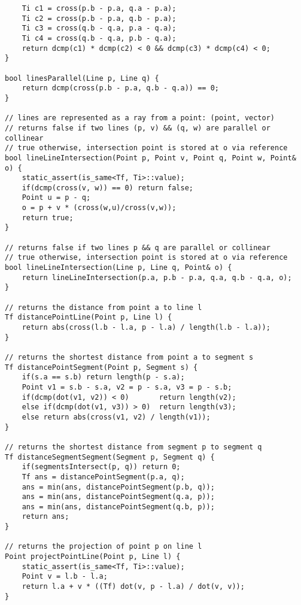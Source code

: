 \documentclass[FSZ,a4paper,onesided]{article}
\begin{document}
\begin{multicols*}{\COLS}
\begin{lstlisting}
    Ti c1 = cross(p.b - p.a, q.a - p.a);
    Ti c2 = cross(p.b - p.a, q.b - p.a);
    Ti c3 = cross(q.b - q.a, p.a - q.a);
    Ti c4 = cross(q.b - q.a, p.b - q.a);
    return dcmp(c1) * dcmp(c2) < 0 && dcmp(c3) * dcmp(c4) < 0;
}

bool linesParallel(Line p, Line q) {
    return dcmp(cross(p.b - p.a, q.b - q.a)) == 0;
}

// lines are represented as a ray from a point: (point, vector)
// returns false if two lines (p, v) && (q, w) are parallel or collinear
// true otherwise, intersection point is stored at o via reference
bool lineLineIntersection(Point p, Point v, Point q, Point w, Point& o) {
    static_assert(is_same<Tf, Ti>::value);
    if(dcmp(cross(v, w)) == 0) return false;
    Point u = p - q;
    o = p + v * (cross(w,u)/cross(v,w));
    return true;
}

// returns false if two lines p && q are parallel or collinear
// true otherwise, intersection point is stored at o via reference
bool lineLineIntersection(Line p, Line q, Point& o) {
    return lineLineIntersection(p.a, p.b - p.a, q.a, q.b - q.a, o);
}

// returns the distance from point a to line l
Tf distancePointLine(Point p, Line l) {
    return abs(cross(l.b - l.a, p - l.a) / length(l.b - l.a));
}

// returns the shortest distance from point a to segment s
Tf distancePointSegment(Point p, Segment s) {
    if(s.a == s.b) return length(p - s.a);
    Point v1 = s.b - s.a, v2 = p - s.a, v3 = p - s.b;
    if(dcmp(dot(v1, v2)) < 0)       return length(v2);
    else if(dcmp(dot(v1, v3)) > 0)  return length(v3);
    else return abs(cross(v1, v2) / length(v1));
}

// returns the shortest distance from segment p to segment q
Tf distanceSegmentSegment(Segment p, Segment q) {
    if(segmentsIntersect(p, q)) return 0;
    Tf ans = distancePointSegment(p.a, q);
    ans = min(ans, distancePointSegment(p.b, q));
    ans = min(ans, distancePointSegment(q.a, p));
    ans = min(ans, distancePointSegment(q.b, p));
    return ans;
}

// returns the projection of point p on line l
Point projectPointLine(Point p, Line l) {
    static_assert(is_same<Tf, Ti>::value);
    Point v = l.b - l.a;
    return l.a + v * ((Tf) dot(v, p - l.a) / dot(v, v));
}\end{lstlisting}

\end{multicols*}
\end{document}

